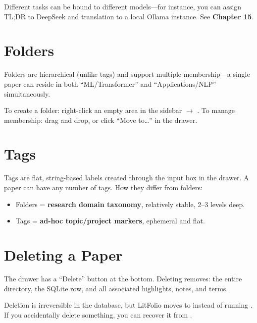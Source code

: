 \begin{tipbox}
Different tasks can be bound to different models---for instance, you can assign TL;DR
to DeepSeek and translation to a local Ollama instance. See \textbf{Chapter 15}.
\end{tipbox}

\section{Folders}

Folders are hierarchical (unlike tags) and support multiple membership---a single paper
can reside in both ``ML/Transformer'' and ``Applications/NLP'' simultaneously.


To create a folder: right-click an empty area in the sidebar $\to$ . To manage
membership: drag and drop, or click ``Move to\ldots'' in the drawer.

\section{Tags}

Tags are flat, string-based labels created through the input box in the drawer. A paper
can have any number of tags. How they differ from folders:

\begin{itemize}
  \item Folders = \textbf{research domain taxonomy}, relatively stable, 2--3 levels deep.
  \item Tags = \textbf{ad-hoc topic/project markers}, ephemeral and flat.
\end{itemize}

\section{Deleting a Paper}

The drawer has a ``Delete'' button at the bottom. Deleting removes: the entire
 directory, the SQLite row, and all associated highlights,
notes, and terms.

\begin{warnbox}
Deletion is irreversible in the database, but LitFolio moves  to
 instead of running . If you
accidentally delete something, you can recover it from .
\end{warnbox}

